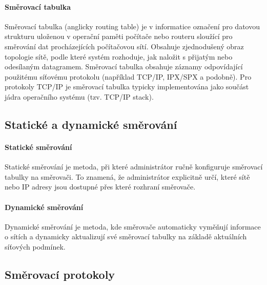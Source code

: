 \paragraph{Směrovací tabulka}
Směrovací tabulka (anglicky routing table) je v informatice označení pro datovou strukturu uloženou v operační paměti počítače nebo routeru sloužící pro směrování dat procházejících počítačovou sítí. Obsahuje zjednodušený obraz topologie sítě, podle které systém rozhoduje, jak naložit s přijatým nebo odesílaným datagramem. Směrovací tabulka obsahuje záznamy odpovídající použitému síťovému protokolu (například TCP/IP, IPX/SPX a podobně). Pro protokoly TCP/IP je směrovací tabulka typicky implementována jako součást jádra operačního systému (tzv. TCP/IP stack).

\subsection{Statické a dynamické směrování}
\paragraph{Statické směrování}
Statické směrování je metoda, při které administrátor ručně konfiguruje směrovací tabulky na směrovači. To znamená, že administrátor explicitně určí, které sítě nebo IP adresy jsou dostupné přes které rozhraní směrovače.

\paragraph{Dynamické směrování}
Dynamické směrování je metoda, kde směrovače automaticky vyměňují informace o sítích a dynamicky aktualizují své směrovací tabulky na základě aktuálních síťových podmínek.

\subsection{Směrovací protokoly}
